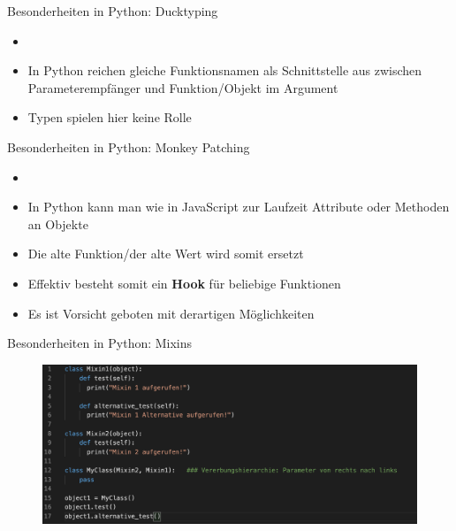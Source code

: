 \begin{frame}{Besonderheiten in Python: Ducktyping}
  \begin{itemize}
        \setlength{\itemindent}{1.2in}
        \item [\textbf{Recap: Ducktyping}]
    \end{itemize}

    \begin{itemize}
        \item In Python reichen gleiche Funktionsnamen als Schnittstelle aus zwischen Parameterempfänger und Funktion/Objekt im Argument
        \item Typen spielen hier keine Rolle
    \end{itemize}

  \end{frame}


\begin{frame}{Besonderheiten in Python: Monkey Patching }
  \begin{itemize}
        \setlength{\itemindent}{1.1in}
        \item [\textbf{Monkey Patching}]
    \end{itemize}

    \begin{itemize}
        \item In Python kann man wie in JavaScript zur Laufzeit Attribute oder Methoden an Objekte 
        \item Die alte Funktion/der alte Wert wird somit ersetzt
        \item Effektiv besteht somit ein \textbf{Hook} für beliebige Funktionen
        \item Es ist Vorsicht geboten mit derartigen Möglichkeiten
    \end{itemize}

  \end{frame}


\begin{frame}{Besonderheiten in Python: Mixins}
   \begin{figure}[!htb]
        \includegraphics[scale=0.37]{img/mixins}  %
    \end{figure}

  \end{frame}


